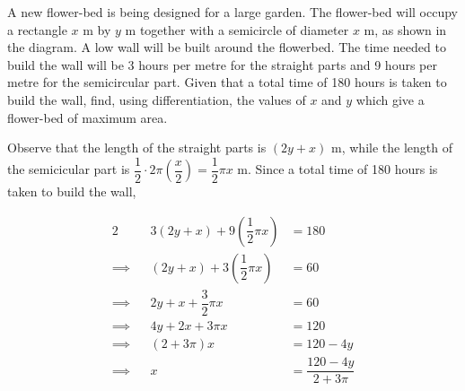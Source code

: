 \documentclass{jhwhw}
\begin{document}

    \problem{}
        \begin{center}
        \end{center}
        
        \noindent A new flower-bed is being designed for a large garden. The flower-bed will occupy a rectangle $x$ m by $y$ m together with a semicircle of diameter $x$ m, as shown in the diagram. A low wall will be built around the flowerbed. The time needed to build the wall will be 3 hours per metre for the straight parts and 9 hours per metre for the semicircular part. Given that a total time of 180 hours is taken to build the wall, find, using differentiation, the values of $x$ and $y$ which give a flower-bed of maximum area.

    \solution
        Observe that the length of the straight parts is $(2y + x)$ m, while the length of the semicicular part is $\dfrac12 \cdot 2\pi\left(\dfrac{x}2\right) = \dfrac12 \pi x$ m. Since a total time of 180 hours is taken to build the wall,

        \begin{alignat*}{2}
            &&3 (2y + x) + 9\left(\dfrac12 \pi x\right) &= 180\\
            \implies&& (2y + x) + 3\left(\dfrac12 \pi x\right) &= 60\\
            \implies&&2y + x + \dfrac32 \pi x &= 60\\
            \implies&&4y + 2x + 3\pi x &= 120\\
            \implies&&(2 + 3\pi)x &= 120-4y\\
            \implies&& x &= \dfrac{120-4y}{2+3\pi}
        \end{alignat*}
\end{document}
